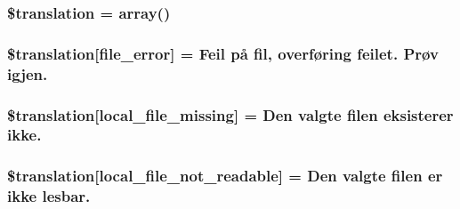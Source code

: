 \subsubsection[{\$translation}]{\setlength{\rightskip}{0pt plus 5cm}\$translation = array()}\label{class_8upload_8no___n_o_8php_a1f198d410fecc3871ebdd468d343a5e3}
\hypertarget{class_8upload_8no___n_o_8php_ac7498e49b9771b04698029aa61c70821}{}
\subsubsection[{\$translation}]{\setlength{\rightskip}{0pt plus 5cm}\$translation\mbox{[}\textquotesingle{}file\+\_\+error\textquotesingle{}\mbox{]} = \textquotesingle{}Feil på fil, overføring feilet. Prøv igjen.\textquotesingle{}}\label{class_8upload_8no___n_o_8php_ac7498e49b9771b04698029aa61c70821}
\hypertarget{class_8upload_8no___n_o_8php_a6ec3d3a47ab70d77e7aa593e82ead10e}{}
\subsubsection[{\$translation}]{\setlength{\rightskip}{0pt plus 5cm}\$translation\mbox{[}\textquotesingle{}local\+\_\+file\+\_\+missing\textquotesingle{}\mbox{]} = \textquotesingle{}Den valgte filen eksisterer ikke.\textquotesingle{}}\label{class_8upload_8no___n_o_8php_a6ec3d3a47ab70d77e7aa593e82ead10e}
\hypertarget{class_8upload_8no___n_o_8php_a60104befef9b241f3a7a6a755618a4b3}{}
\subsubsection[{\$translation}]{\setlength{\rightskip}{0pt plus 5cm}\$translation\mbox{[}\textquotesingle{}local\+\_\+file\+\_\+not\+\_\+readable\textquotesingle{}\mbox{]} = \textquotesingle{}Den valgte filen er ikke lesbar.\textquotesingle{}}\label{class_8upload_8no___n_o_8php_a60104befef9b241f3a7a6a755618a4b3}
\hypertarget{class_8upload_8no___n_o_8php_a6a08dcd0d3651fdd098568f6b2f0a42c}{}

